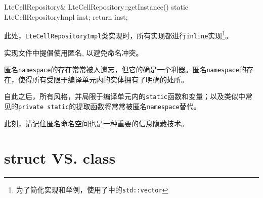 \begin{content}
\begin{leftbar}
\begin{c++}
LteCellRepository& LteCellRepository::getInstance()
{
    static LteCellRepositoryImpl inst;
    return inst;
}
\end{c++}
\end{leftbar}

此处，\texttt{LteCellRepositoryImpl}类实现时，所有实现都进行\texttt{inline}实现\footnote{为了简化实现和举例，使用了中的\texttt{std::vector}}。

\begin{regulation}
实现文件中提倡使用匿名, 以避免命名冲突。
\end{regulation}

匿名\texttt{namespace}的存在常常被人遗忘，但它的确是一个利器。匿名\texttt{namespace}的存在，使得所有受限于编译单元内的实体拥有了明确的处所。

自此之后，所有\clang{}风格，并局限于编译单元内的\texttt{static}函数和变量；以及类似中常见的\texttt{private static}的提取函数将常常被匿名\texttt{namespace}替代。

此刻，请记住匿名命名空间也是一种重要的信息隐藏技术。

\end{content}

\section{struct VS. class}

